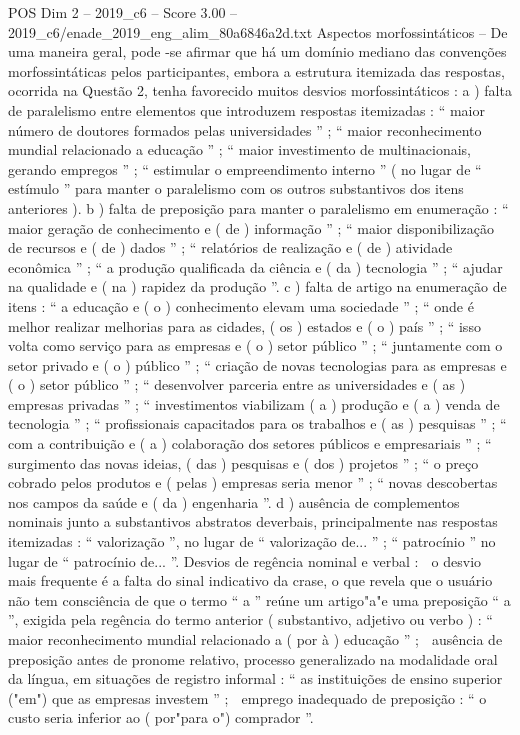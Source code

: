 \begin{textsample}{POS Dim 2 – 2019\_c6 – Score 3.00 – 2019\_c6/enade\_2019\_eng\_alim\_80a6846a2d.txt}
Aspectos morfossintáticos – De uma maneira geral, pode -se afirmar que há um domínio mediano das convenções morfossintáticas pelos participantes, embora a estrutura itemizada das respostas, ocorrida na Questão 2, tenha favorecido muitos desvios morfossintáticos : a ) falta de paralelismo entre elementos que introduzem respostas itemizadas : “ maior número de doutores formados pelas universidades ” ; “ maior reconhecimento mundial relacionado a educação ” ; “ maior investimento de multinacionais, gerando empregos ” ; “ estimular o empreendimento interno ” ( no lugar de “ estímulo ” para manter o paralelismo com os outros substantivos dos itens anteriores ). b ) falta de preposição para manter o paralelismo em enumeração : “ maior geração de conhecimento e ( de ) informação ” ; “ maior disponibilização de recursos e ( de ) dados ” ; “ relatórios de realização e ( de ) atividade econômica ” ; “ a produção qualificada da ciência e ( da ) tecnologia ” ; “ ajudar na qualidade e ( na ) rapidez da produção ”. c ) falta de artigo na enumeração de itens : “ a educação e ( o ) conhecimento elevam uma sociedade ” ; “ onde é melhor realizar melhorias para as cidades, ( os ) estados e ( o ) país ” ; “ isso volta como serviço para as empresas e ( o ) setor público ” ; “ juntamente com o setor privado e ( o ) público ” ; “ criação de novas tecnologias para as empresas e ( o ) setor público ” ; “ desenvolver parceria entre as universidades e ( as ) empresas privadas ” ; “ investimentos viabilizam ( a ) produção e ( a ) venda de tecnologia ” ; “ profissionais capacitados para os trabalhos e ( as ) pesquisas ” ; “ com a contribuição e ( a ) colaboração dos setores públicos e empresariais ” ; “ surgimento das novas ideias, ( das ) pesquisas e ( dos ) projetos ” ; “ o preço cobrado pelos produtos e ( pelas ) empresas seria menor ” ; “ novas descobertas nos campos da saúde e ( da ) engenharia ”. d ) ausência de complementos nominais junto a substantivos abstratos deverbais, principalmente nas respostas itemizadas : “ valorização ”, no lugar de “ valorização de... ” ; “ patrocínio ” no lugar de “ patrocínio de... ”.
Desvios de regência nominal e verbal :  o desvio mais frequente é a falta do sinal indicativo da crase, o que revela que o usuário não tem consciência de que o termo “ a ” reúne um artigo"a"e uma preposição “ a ”, exigida pela regência do termo anterior ( substantivo, adjetivo ou verbo ) : “ maior reconhecimento mundial relacionado a ( por à ) educação ” ;  ausência de preposição antes de pronome relativo, processo generalizado na modalidade oral da língua, em situações de registro informal : “ as instituições de ensino superior ("em") que as empresas investem ” ;  emprego inadequado de preposição : “ o custo seria inferior ao ( por"para o") comprador ”.

\end{textsample}
